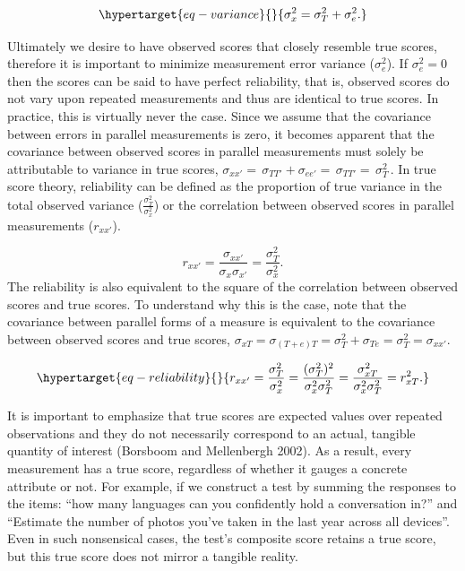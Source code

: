 \documentclass[
  letterpaper,
  DIV=11,
  numbers=noendperiod]{scrreprt}
\begin{document}
\begin{equation}\protect\hypertarget{eq-variance}{}{
\sigma_{x}^2 = \sigma_T^2 + \sigma_{e}^2.
}\label{eq-variance}\end{equation}

Ultimately we desire to have observed scores that closely resemble true
scores, therefore it is important to minimize measurement error variance
(\(\sigma^2_e\)). If \(\sigma_{e}^2 = 0\) then the scores can be said to
have perfect reliability, that is, observed scores do not vary upon
repeated measurements and thus are identical to true scores. In
practice, this is virtually never the case. Since we assume that the
covariance between errors in parallel measurements is zero, it becomes
apparent that the covariance between observed scores in parallel
measurements must solely be attributable to variance in true scores,
\(\sigma_{xx'}=\,\)\(\sigma_{TT'} + \sigma_{ee'}=\,\)\(\sigma_{TT'}=\,\)\(\sigma_T^2\,\).
In true score theory, reliability can be defined as the proportion of
true variance in the total observed variance
(\(\frac{\sigma_T^2}{\sigma_x^2}\)) or the correlation between observed
scores in parallel measurements (\(r_{xx'}\)).

\[
r_{xx'}=\frac{\sigma_{xx'}}{\sigma_x\sigma_{x'}}  = \frac{\sigma_T^2}{\sigma^2_{x}}.
\] The reliability is also equivalent to the square of the correlation
between observed scores and true scores. To understand why this is the
case, note that the covariance between parallel forms of a measure is
equivalent to the covariance between observed scores and true scores,
\(\sigma_{xT}=\)\(\sigma_{(T+e)T}=\)\(\sigma^2_T + \sigma_{Te}=\)\(\sigma^2_T = \sigma_{xx'}\).

\begin{equation}\protect\hypertarget{eq-reliability}{}{
r_{xx'} = \frac{\sigma_T^2}{\sigma_{x}^2} = \frac{(\sigma_T^2)^2}{\sigma_x^2 \sigma_T^2}= \frac{\sigma_{xT}^2}{\sigma^2_x\sigma^2_T} = r^2_{xT}.
}\label{eq-reliability}\end{equation}

It is important to emphasize that true scores are expected values over
repeated observations and they do not necessarily correspond to an
actual, tangible quantity of interest (Borsboom and Mellenbergh 2002).
As a result, every measurement has a true score, regardless of whether
it gauges a concrete attribute or not. For example, if we construct a
test by summing the responses to the items: ``how many languages can you
confidently hold a conversation in?'' and ``Estimate the number of
photos you've taken in the last year across all devices''. Even in such
nonsensical cases, the test's composite score retains a true score, but
this true score does not mirror a tangible reality.
\end{document}
